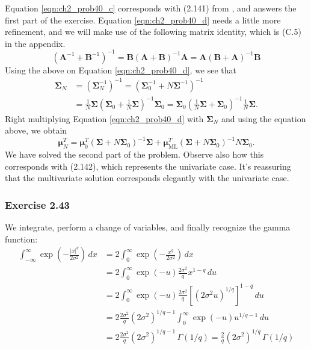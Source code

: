 \documentclass[12pt, a4paper]{article}
\newcommand{\vect}[1]{\bm{#1}}
\newcommand{\abs}[1]{\left\lvert#1\right\rvert}
\begin{document}
Equation \eqref{eqn:ch2_prob40_c} corresponds with (2.141) from \cite{bishop_pattern_2011}, and answers the first part of the exercise.
Equation \eqref{eqn:ch2_prob40_d} needs a little more refinement, and we will make use of the following matrix identity, which is (C.5) in the appendix.
\begin{equation*}
	(\vect{A}^{-1} + \vect{B}^{-1})^{-1} = \vect{B}( \vect{A} + \vect{B})^{-1} \vect{A} = \vect{A}( \vect{B} + \vect{A})^{-1} \vect{B}
\end{equation*}
Using the above on Equation \eqref{eqn:ch2_prob40_d}, we see that
\begin{align*}
	\vect{\Sigma}_N &= \left( \vect{\Sigma}_N^{-1} \right)^{-1}
	= \left( \vect{\Sigma}_0^{-1} + N \vect{\Sigma}^{-1} \right)^{-1} \\
	&= \frac{1}{N} \vect{\Sigma} \left( \vect{\Sigma}_0 + \frac{1}{N} \vect{\Sigma} \right)^{-1} \vect{\Sigma}_0
	= \vect{\Sigma}_0 \left( \frac{1}{N} \vect{\Sigma} + \vect{\Sigma}_0 \right)^{-1} \frac{1}{N} \vect{\Sigma}.
\end{align*}
Right multiplying Equation \eqref{eqn:ch2_prob40_d} with $\vect{\Sigma}_N$ and using the equation above, we obtain
\begin{equation*}
	\vect{\mu}_N^T = \vect{\mu}_0^T \left( \vect{\Sigma} +N \vect{\Sigma}_0 \right)^{-1} \vect{\Sigma}
	+ \vect{\mu}_{\text{ML}}^T  \left( \vect{\Sigma} +N \vect{\Sigma}_0 \right)^{-1} N \vect{\Sigma}_0.
\end{equation*}
We have solved the second part of the problem.
Observe also how this corresponds with (2.142), which represents the univariate case.
It's reassuring that the multivariate solution corresponds elegantly with the univariate case.


\subsubsection*{Exercise 2.43}
We integrate, perform a change of variables, and finally recognize the gamma function:
\begin{align*}
	\int_{-\infty}^{\infty}  \exp \left( - \frac{\abs{x}^q}{2 \sigma^2} \right) \, dx &= 
	2 \int_{0}^{\infty}  \exp \left( - \frac{x^q}{2 \sigma^2} \right) \, dx \tag{symmetry} \\
	&= 
	2 \int_{0}^{\infty}  \exp \left( - u \right)
	\frac{2 \sigma^2}{q} x^{1-q} \, du
	 \tag{substitute $u = x^q / 2 \sigma^2$} \\
	 &= 
	 2 \int_{0}^{\infty}  \exp \left( - u \right)
	 \frac{2 \sigma^2}{q} \left[ \left( 2 \sigma^2 u \right)^{1/q} \right]^{1-q} \, du
	 \tag{substitute definition} \\
	 &= 
	 2 
	 \frac{2 \sigma^2}{q} (2 \sigma^2)^{1/q - 1}
	 \int_{0}^{\infty}  \exp \left( - u \right)
	 u^{1/q - 1} \, du
	 \tag{recognize $\Gamma(1/q)$} \\
	 &= 
	 2 
	 \frac{2 \sigma^2}{q} (2 \sigma^2)^{1/q - 1}
	 \, \Gamma(1/q) = \frac{2}{q} (2 \sigma^2)^{1/q} \, \Gamma (1 / q)
\end{align*}
\end{document}
